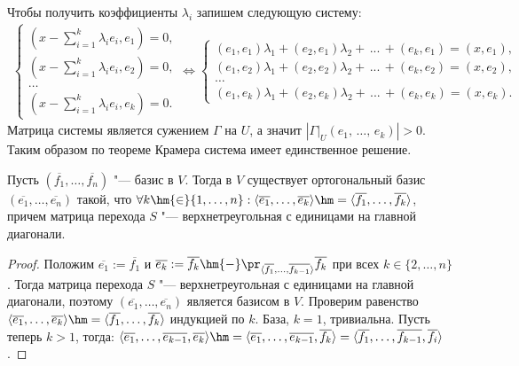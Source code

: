 \begin{algorithm}
\begin{enumerate}
        Чтобы получить коэффициенты $\lambda_i$ запишем следующую систему:
        \begin{eqnarray*}
            \begin{cases*}
                (x - \displaystyle\sum_{i=1}^{k} \lambda_i e_i, e_1) = 0,
                \\
                (x - \displaystyle\sum_{i=1}^{k} \lambda_i e_i, e_2) = 0,
                \\
                \dots
                \\
                (x - \displaystyle\sum_{i=1}^{k} \lambda_i e_i, e_k) = 0.
            \end{cases*} \Leftrightarrow \begin{cases*}
                (e_1, e_1) \lambda_1 + (e_2, e_1) \lambda_2 + \, ... \, + (e_k, e_1) = (x, e_1),
                \\
                (e_1, e_2) \lambda_1 + (e_2, e_2) \lambda_2 + \, ... \, + (e_k, e_2) = (x, e_2),
                \\
                \dots
                \\
                (e_1, e_k) \lambda_1 + (e_2, e_k) \lambda_2 + \, ... \, + (e_k, e_k) = (x, e_k).
            \end{cases*}
        \end{eqnarray*}
        Матрица системы является сужением $\Gamma$ на $U$, а значит $|\Gamma \vert_{U} (e_1, \, \dots, \, e_k)| > 0$.
        Таким образом по теореме Крамера система имеет единственное решение.
    \end{enumerate}
\end{algorithm}

\begin{theorem}
    Пусть $(\overline{f_1}, \dots, \overline{f_n})$ "--- базис в $V$. Тогда в $V$ существует ортогональный базис $(\overline{e_1}, \dots, \overline{e_n})$ такой, что $\forall k \hm{\in} \{1, \dots, n\}: \langle\overline{e_1}, \dots, \overline{e_k}\rangle \hm= \langle\overline{f_1}, \dots, \overline{f_k}\rangle$, причем матрица перехода $S$ "--- верхнетреугольная с единицами на главной диагонали.
\end{theorem}

\begin{proof}
    Положим $\overline{e_1} := \overline{f_1}$ и $\overline{e_k} := \overline{f_k} \hm{-} \pr_{\langle\overline{f_1}, \dots, \overline{f_{k - 1}}\rangle}\overline{f_k}$ при всех $k \in \{2, \dots, n\}$. Тогда матрица перехода $S$ "--- верхнетреугольная с единицами на главной диагонали, поэтому $(\overline{e_1}, \dotsc, \overline{e_n})$ является базисом в $V$. Проверим равенство $\langle\overline{e_1}, \dots, \overline{e_k}\rangle \hm= \langle\overline{f_1}, \dots, \overline{f_k}\rangle$ индукцией по $k$. База, $k = 1$, тривиальна. Пусть теперь $k > 1$, тогда: $\langle\overline{e_1}, \dots, \overline{e_{k-1}}, \overline{e_k}\rangle \hm= \langle\overline{e_1}, \dots, \overline{e_{k-1}}, \overline{f_k}\rangle = \langle\overline{f_1}, \dots, \overline{f_{k-1}}, \overline{f_i}\rangle$.
\end{proof}

